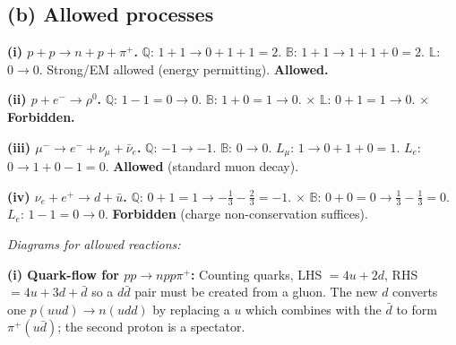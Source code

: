 \documentclass[11pt]{article}
\begin{document}
\subsection*{(b) Allowed processes}

\textbf{(i) $p+p\to n+p+\pi^+$.}
$\mathbb{Q}$: $1+1 \to 0+1+1=2$. \checkmark\;
$\mathbb{B}$: $1+1\to 1+1+0=2$. \checkmark\;
$\mathbb{L}$: $0\to 0$. \checkmark\;
Strong/EM allowed (energy permitting). \textbf{Allowed.}

\textbf{(ii) $p+e^-\to \rho^0$.}
$\mathbb{Q}$: $1-1=0\to 0$. \checkmark\;
$\mathbb{B}$: $1+0=1\to 0$. $\boldsymbol{\times}$\; $\mathbb{L}$: $0+1=1\to 0$. $\boldsymbol{\times}$\;
\textbf{Forbidden.}

\textbf{(iii) $\mu^-\to e^- + \nu_\mu + \bar\nu_e$.}
$\mathbb{Q}$: $-1\to -1$. \checkmark\;
$\mathbb{B}$: $0\to 0$. \checkmark\;
$L_\mu$: $1\to 0+1+0=1$. \checkmark\;
$L_e$: $0\to 1+0-1=0$. \checkmark\;
\textbf{Allowed} (standard muon decay).

\textbf{(iv) $\nu_e + e^+ \to d + \bar u$.}
$\mathbb{Q}$: $0+1=1\to -\tfrac13 -\tfrac23 = -1$. $\boldsymbol{\times}$\;
$\mathbb{B}$: $0+0=0\to \tfrac13 -\tfrac13 = 0$. \checkmark\;
$L_e$: $1-1=0\to 0$. \checkmark\;
\textbf{Forbidden} (charge non-conservation suffices).

\textit{Diagrams for allowed reactions:}

\textbf{(i) Quark-flow for $pp\to npp\pi^+$:} Counting quarks, LHS $= 4u+2d$, RHS $= 4u+3d+\bar d$ so a $d\bar d$ pair must be created from a gluon. The new $d$ converts one $p(uud)\to n(udd)$ by replacing a $u$ which combines with the $\bar d$ to form $\pi^+(u\bar d)$; the second proton is a spectator.

\begin{center}
\end{center}
\end{document}
